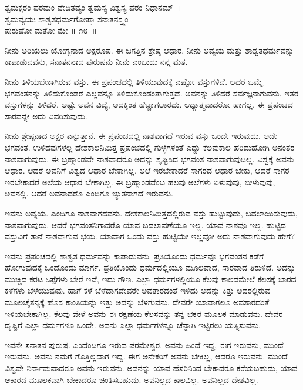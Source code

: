 \begin{shloka}
ತ್ವಮಕ್ಷರಂ ಪರಮಂ ವೇದಿತವ್ಯಂ ತ್ವಮಸ್ಯ ವಿಶ್ವಸ್ಯ ಪರಂ ನಿಧಾನಮ್~।\\ತ್ವಮವ್ಯಯಃ ಶಾಶ್ವತಧರ್ಮಗೋಪ್ತಾ ಸನಾತನಸ್ತ್ವಂ\\ ಪುರುಷೋ ಮತೋ ಮೇ \hfill॥ ೧೮~॥
\end{shloka}

\begin{artha}
ನೀನು ಅರಿಯಲು ಯೋಗ್ಯನಾದ ಅಕ್ಷರೂಪ. ಈ ಜಗತ್ತಿನ ಶ್ರೇಷ್ಠ ಆಧಾರ. ನೀನು ಅವ್ಯಯ ಮತ್ತು ಶಾಶ್ವತಧರ್ಮವನ್ನು ಕಾಪಾಡುವವನು, ಸನಾತನನಾದ ಪುರುಷನು ನೀನು ಎಂಬುದು ನನ್ನ ಮತ.
\end{artha}

ನೀನು ತಿಳಿಯಬೇಕಾಗಿರುವ ವಸ್ತು. ಈ ಪ್ರಪಂಚದಲ್ಲಿ ತಿಳಿಯುವುದಕ್ಕೆ ಎಷ್ಟೋ ವಸ್ತುಗಳಿವೆ. ಆದರೆ ಒಮ್ಮೆ ಭಗವಂತನನ್ನು ತಿಳಿದುಕೊಂಡರೆ ಎಲ್ಲವನ್ನೂ ತಿಳಿದುಕೊಂಡಂತಾಗುತ್ತದೆ. ಅವನನ್ನು ತಿಳಿದರೆ ಸರ್ವಜ್ಞನಾಗುವನು. ಇತರ ವಸ್ತುಗಳನ್ನು ತಿಳಿದರೆ, ಅಷ್ಟೇ ಅವನ ವಿದ್ಯೆ, ಅದಕ್ಕಿಂತ ಹೆಚ್ಚಾಗಲಾರದು. ಆಧ್ಯಾತ್ಮವಾದರೋ ಹಾಗಲ್ಲ. ಈ ಪ್ರಪಂಚದ ಸಾರವನ್ನೇ ಅದು ವಿವರಿಸುವುದು.

ನೀನು ಶ್ರೇಷ್ಠನಾದ ಅಕ್ಷರ ಎನ್ನುತ್ತಾನೆ. ಈ ಪ್ರಪಂಚದಲ್ಲಿ ನಾಶವಾಗದೆ ಇರುವ ವಸ್ತು ಒಂದೇ ಇರುವುದು. ಅದೇ ಭಗವಂತ. ಉಳಿದವುಗಳೆಲ್ಲ ದೇಶಕಾಲನಿಮಿತ್ತ ಪ್ರಪಂಚದಲ್ಲಿ ಗುಳ್ಳೆಗಳಂತೆ ಎದ್ದು ಕೆಲವುಕಾಲ ಹರಿದುಹೋಗಿ ಅನಂತರ ನಾಶವಾಗುವುದು. ಈ ಬ್ರಹ್ಮಾಂಡವೇ ನಾಶವಾದರೂ ಅದನ್ನು ಸೃಷ್ಟಿಸಿದ ಭಗವಂತ ನಾಶವಾಗುವುದಿಲ್ಲ. ವಿಶ್ವಕ್ಕೆ ಅವನು ಆಧಾರ. ಆದರೆ ಅವನಿಗೆ ವಿಶ್ವದ ಆಧಾರ ಬೇಕಾಗಿಲ್ಲ. ಅಲೆ ಇರಬೇಕಾದರೆ ಸಾಗರದ ಆಧಾರ ಬೇಕು, ಆದರೆ ಸಾಗರ ಇರಬೇಕಾದರೆ ಅಲೆಯ ಆಧಾರ ಬೇಕಾಗಿಲ್ಲ. ಈ ಬ್ರಹ್ಮಾಂಡವೆಂಬ ಹಲವು ಅಲೆಗಳು ಏಳುವುವು, ಬೀಳುವುವು, ಅವನಲ್ಲಿ. ಆದರೆ ಅವನಾದರೊ ಎಂದಿಗೂ ಚ್ಯುತನಾಗದೆ ಇರುವನು. 

ಇವನು ಅವ್ಯಯ. ಎಂದಿಗೂ ನಾಶವಾಗದವನು. ದೇಶಕಾಲನಿಮಿತ್ತದಲ್ಲಿರುವ ವಸ್ತು ಹುಟ್ಟುವುದು, ಬದಲಾಯಿಸುವುದು, ನಾಶವಾಗುವುದು. ಆದರೆ ಭಗವಂತನಿಗಾದರೊ ಯಾವ ಬದಲಾವಣೆಯೂ ಇಲ್ಲ. ಯಾವ ನಾಶವೂ ಇಲ್ಲ. ಹುಟ್ಟಿದ ವಸ್ತುವಿಗೆ ತಾನೆ ನಾಶವಾಗುವ ಭಯ. ಯಾವಾಗ ಒಂದು ವಸ್ತು ಹುಟ್ಟಿಯೇ ಇಲ್ಲವೋ ಅದು ನಾಶವಾಗುವುದು ಹೇಗೆ?

ಇವನು ಪ್ರಪಂಚದಲ್ಲಿ ಶಾಶ್ವತ ಧರ್ಮವನ್ನು ಕಾಪಾಡುವನು. ಪ್ರತಿಯೊಂದು ಧರ್ಮವೂ ಭಗವಂತನ ಕಡೆಗೆ ಹೋಗುವುದಕ್ಕೆ ಒಂದೊಂದು ಮಾರ್ಗ. ಪ್ರತಿಯೊಂದು ಧರ್ಮದಲ್ಲಿಯೂ ಮೂಲವಾದ, ಸಾರವಾದ ತಿರುಳಿದೆ. ಅದನ್ನು ಮುಚ್ಚಿದ ಕರಟ ಸಿಪ್ಪೆಗಳು ಬೇರೆ ಇವೆ, ಇದು ಗೌಣ. ಎಲ್ಲಾ ಧರ್ಮಗಳಲ್ಲಿಯೂ ಕೆಲವು ಕಾಲದಮೇಲೆ ಕೆಲಸಕ್ಕೆ ಬಾರದ ಕಳೆಗಳು ಬೆಳೆಯುವುವು. ಹಾಗೆ ಕಳೆ ಬೆಳೆದಾಗದೇವರೇ ಅವತಾರದಂತೆ ಇಳಿದು ಅದನ್ನು ಕಿತ್ತು ಅದರಲ್ಲಿರುವ ಮೂಲಚೈತನ್ಯಕ್ಕೆ ಹೊಸ ಕಾಂತಿಯನ್ನು ಇತ್ತು ಅದನ್ನು ಬೆಳಗುವನು. ದೇವರೇ ಯಾವಾಗಲೂ ಅವತಾರದಂತೆ ಇಳಿಯಬೇಕಾಗಿಲ್ಲ. ಕೆಲವು ವೇಳೆ ಅವನು ಈ ರಕ್ಷಣೆಯ ಕೆಲಸವನ್ನು ತನ್ನ ಭಕ್ತರ ಮೂಲಕ ಮಾಡುವನು. ದೇವರ ದೃಷ್ಟಿಗೆ ಎಲ್ಲಾ ಧರ್ಮಗಳೂ ಒಂದೇ. ಅವನು ಎಲ್ಲಾ ಧರ್ಮಗಳನ್ನೂ ಚೆನ್ನಾಗಿ ಇಟ್ಟಿರಲು ಯತ್ನಿಸುವನು.

ಇವನೇ ಸನಾತನ ಪುರುಷ. ಎಂದೆಂದಿಗೂ ಇರುವ ಪರಮೇಶ್ವರ. ಅವನು ಹಿಂದೆ ಇದ್ದ, ಈಗ ಇರುವನು, ಮುಂದೆ ಇರುವನು. ಅವನು ನಮಗೆ ಗೊತ್ತಿಲ್ಲದಾಗ ಇದ್ದ. ಈಗ ಅನೇಕರಿಗೆ ಅವನು ಬೇಕಿಲ್ಲ, ಆದರೂ ಇರುವನು. ಮುಂದೆ ವಿಶ್ವವೇ ನಿರ್ನಾಮವಾದರೂ ಅವನು ಇರುವನು. ಅವನನ್ನು ಯಾವ ಹೆಸರಿನಿಂದ ಬೇಕಾದರೂ ಕರೆಯಬಹುದು, ಯಾವ ಆಕಾರದ ಮೂಲಕವಾಗಿ ಬೇಕಾದರೂ ಚಿಂತಿಸಬಹುದು. ಅವನಿಲ್ಲದ ಕಾಲವಿಲ್ಲ. ಅವನಿಲ್ಲದ ದೇಶವಿಲ್ಲ.

